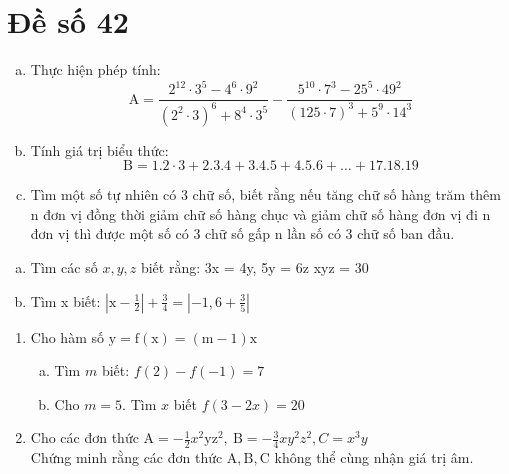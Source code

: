\section{Đề số 42}

\begin{bt} 
	\hfill
	\begin{enumerate}[a.]
		\item Thực hiện phép tính:
		$$
		\mathrm{A}=\frac{2^{12} \cdot 3^5-4^6 \cdot 9^2}{\left(2^2 \cdot 3\right)^6+8^4 \cdot 3^5}-\frac{5^{10} \cdot 7^3-25^5 \cdot 49^2}{(125 \cdot 7)^3+5^9 \cdot 14^3}
		$$
		\item Tính giá trị biểu thức:
		$$
		\mathrm{B}=1.2 \cdot 3+2.3 .4+3.4 .5+4.5 .6+\ldots+17.18 .19
		$$
		\item Tìm một số tự nhiên có 3 chữ số, biết rằng nếu tăng chữ số hàng trăm thêm $\mathrm{n}$ đơn vị đồng thời giảm chữ số hàng chục và giảm chữ số hàng đơn vị đi n đơn vị thì được một số có 3 chữ số gấp n lần số có 3 chữ số ban đầu.
	\end{enumerate}
	\loigiai{} 
\end{bt}

\begin{bt}
	\hfill
	\begin{enumerate}[a.]
		\item Tìm các số $x, y, z$ biết rằng: 3x = 4y, 5y = 6z  xyz = 30
		\item Tìm x biết: $\left|\mathrm{x}-\frac{1}{2}\right|+\frac{3}{4}=\left|-1,6+\frac{3}{5}\right|$
	\end{enumerate}
	\loigiai{} 
\end{bt}

\begin{bt}
	\hfill 
	\begin{enumerate}[1.]
		\item Cho hàm số $\mathrm{y}=\mathrm{f}(\mathrm{x})=(\mathrm{m}-1) \mathrm{x}$
		\begin{enumerate}[a.]
			\item Tìm $m$ biết: $f(2)-f(-1)=7$
			\item Cho $m=5$. Tìm $x$ biết $f(3-2 x)=20$
		\end{enumerate}
		\item Cho các đơn thức $\mathrm{A}=-\frac{1}{2} x^2 \mathrm{yz}^2, \mathrm{~B}=-\frac{3}{4} x y^2 z^2, C=x^3 y$
		\\Chứng minh rằng các đơn thức $\mathrm{A}, \mathrm{B}, \mathrm{C}$ không thể cùng nhận giá trị âm.
	\end{enumerate}
	\loigiai{} 
\end{bt}

